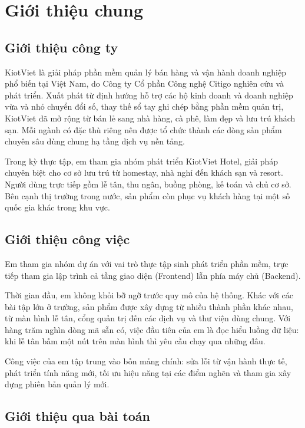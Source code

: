 \section{Giới thiệu chung}

\subsection{Giới thiệu công ty}

KiotViet là giải pháp phần mềm quản lý bán hàng và vận hành doanh nghiệp phổ biến tại Việt Nam, do Công ty Cổ phần Công nghệ Citigo nghiên cứu và phát triển. Xuất phát từ định hướng hỗ trợ các hộ kinh doanh và doanh nghiệp vừa và nhỏ chuyển đổi số, thay thế sổ tay ghi chép bằng phần mềm quản trị, KiotViet đã mở rộng từ bán lẻ sang nhà hàng, cà phê, làm đẹp và lưu trú khách sạn. Mỗi ngành có đặc thù riêng nên được tổ chức thành các dòng sản phẩm chuyên sâu dùng chung hạ tầng dịch vụ nền tảng.

Trong kỳ thực tập, em tham gia nhóm phát triển KiotViet Hotel, giải pháp chuyên biệt cho cơ sở lưu trú từ homestay, nhà nghỉ đến khách sạn và resort. Người dùng trực tiếp gồm lễ tân, thu ngân, buồng phòng, kế toán và chủ cơ sở. Bên cạnh thị trường trong nước, sản phẩm còn phục vụ khách hàng tại một số quốc gia khác trong khu vực.
\subsection{Giới thiệu công việc}

Em tham gia nhóm dự án với vai trò thực tập sinh phát triển phần mềm, trực tiếp tham gia lập trình cả tầng giao diện (Frontend) lẫn phía máy chủ (Backend).

Thời gian đầu, em không khỏi bỡ ngỡ trước quy mô của hệ thống. Khác với các bài tập lớn ở trường, sản phẩm được xây dựng từ nhiều thành phần khác nhau, từ màn hình lễ tân, cổng quản trị đến các dịch vụ và thư viện dùng chung. Với hàng trăm nghìn dòng mã sẵn có, việc đầu tiên của em là đọc hiểu luồng dữ liệu: khi lễ tân bấm một nút trên màn hình thì yêu cầu chạy qua những đâu.

Công việc của em tập trung vào bốn mảng chính: sửa lỗi từ vận hành thực tế, phát triển tính năng mới, tối ưu hiệu năng tại các điểm nghẽn và tham gia xây dựng phiên bản quản lý mới.

\subsection{Giới thiệu qua bài toán}

